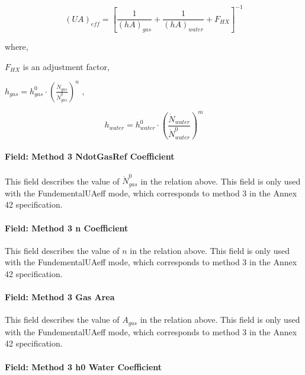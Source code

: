 \begin{equation}
{\left( {UA} \right)_{eff}} = {\left[ {\frac{1}{{{{\left( {hA} \right)}_{gas}}}} + \frac{1}{{{{(hA)}_{water}}}} + {F_{HX}}} \right]^{ - 1}}
\end{equation}

where,

\({F_{HX}}\) is an adjustment factor,

\({h_{gas}} = h_{gas}^0 \cdot {\left( {\frac{{{{\dot N}_{gas}}}}{{\dot N_{gas}^0}}} \right)^n}\) ,

\begin{equation}
{h_{water}} = h_{water}^0 \cdot {\left( {\frac{{{{\dot N}_{water}}}}{{\dot N_{water}^0}}} \right)^m}
\end{equation}

\paragraph{Field: Method 3 NdotGasRef Coefficient}\label{field-method-3-ndotgasref-coefficient}

This field describes the value of \(\dot N_{gas}^0\) in the relation above. This field is only used with the FundementalUAeff mode, which corresponds to method 3 in the Annex 42 specification.

\paragraph{Field: Method 3 n Coefficient}\label{field-method-3-n-coefficient}

This field describes the value of \(n\) in the relation above. This field is only used with the FundementalUAeff mode, which corresponds to method 3 in the Annex 42 specification.

\paragraph{Field: Method 3 Gas Area}\label{field-method-3-gas-area}

This field describes the value of \({A_{gas}}\) in the relation above. This field is only used with the FundementalUAeff mode, which corresponds to method 3 in the Annex 42 specification.

\paragraph{Field: Method 3 h0 Water Coefficient}\label{field-method-3-h0-water-coefficient}

